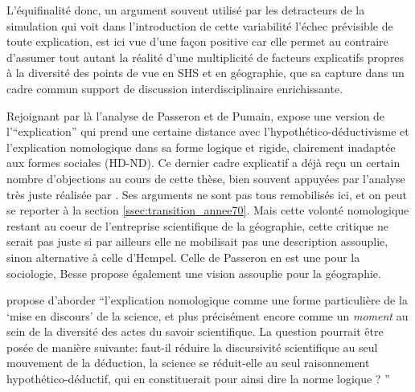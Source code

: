 L'équifinalité donc, un argument souvent utilisé par les detracteurs de la simulation qui voit dans l'introduction de cette variabilité l'échec prévisible de toute explication, est ici vue d'une façon positive car elle permet au contraire d'assumer tout autant la réalité d'une multiplicité de facteurs explicatifs propres à la diversité des points de vue en SHS et en géographie, que sa capture dans un cadre commun support de discussion interdisciplinaire enrichissante. 

Rejoignant par là l'analyse de Passeron et de Pumain, \textcite{Besse2000} expose une version de l'\enquote{explication} qui prend une certaine distance avec l'hypothético-déductivisme et l'explication nomologique dans sa forme logique et rigide, clairement inadaptée aux formes sociales (HD-ND). Ce dernier cadre explicatif a déjà reçu un certain nombre d'objections au cours de cette thèse, bien souvent appuyées par l'analyse très juste réalisée par \textcite{Besse2000}. Ses arguments ne sont pas tous remobilisés ici, et on peut se reporter à la section \ref{ssec:transition_annee70}. Mais cette volonté nomologique restant au coeur de l'entreprise scientifique de la géographie, cette critique ne serait pas juste si par ailleurs elle ne mobilisait pas une description assouplie, sinon alternative à celle d'Hempel. Celle de Passeron en est une pour la sociologie, Besse propose également une vision assouplie pour la géographie.

\textcite{Besse2000} propose d'aborder \enquote{l'explication nomologique comme une forme particulière de la \enquote{mise en discours} de la science, et plus précisément encore comme un \textit{moment} au sein de la diversité des actes du savoir scientifique. La question pourrait être posée de manière suivante: faut-il réduire la discursivité scientifique au seul mouvement de la déduction, la science se réduit-elle au seul raisonnement hypothético-déductif, qui en constituerait pour ainsi dire la norme logique ? }
 
